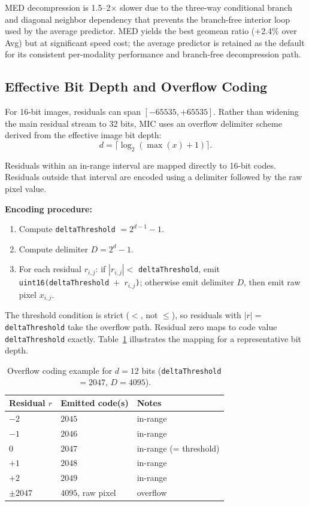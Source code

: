 \documentclass[journal]{IEEEtran}
\begin{document}
MED decompression is 1.5--2$\times$ slower due to the three-way conditional
branch and diagonal neighbor dependency that prevents the branch-free interior
loop used by the average predictor. MED yields the best geomean ratio
($+$2.4\% over Avg) but at significant speed cost; the average predictor is
retained as the default for its consistent per-modality performance and
branch-free decompression path.

\subsection{Effective Bit Depth and Overflow Coding}

For 16-bit images, residuals can span $[-65535, +65535]$. Rather than widening
the main residual stream to 32 bits, MIC uses an overflow delimiter scheme
derived from the effective image bit depth:
\begin{equation}
  d = \lceil \log_2(\max(x) + 1) \rceil.
\end{equation}

Residuals within an in-range interval are mapped directly to 16-bit codes.
Residuals outside that interval are encoded using a delimiter followed by the
raw pixel value.

\textbf{Encoding procedure:}
\begin{enumerate}
  \item Compute \texttt{deltaThreshold} $= 2^{d-1} - 1$.
  \item Compute delimiter $D = 2^d - 1$.
  \item For each residual $r_{i,j}$: if $|r_{i,j}| <$ \texttt{deltaThreshold},
  emit \texttt{uint16(deltaThreshold $+$ $r_{i,j}$)}; otherwise emit delimiter
  $D$, then emit raw pixel $x_{i,j}$.
\end{enumerate}

The threshold condition is strict ($<$, not $\leq$), so residuals with
$|r| =$ \texttt{deltaThreshold} take the overflow path. Residual zero maps
to code value \texttt{deltaThreshold} exactly. Table~\ref{tab:overflow-map}
illustrates the mapping for a representative bit depth.

\begin{table}[htbp]
\centering
\caption{Overflow coding example for $d=12$ bits
(\texttt{deltaThreshold}$=2047$, $D=4095$).}
\label{tab:overflow-map}
\scriptsize
\begin{tabular}{lll}
\toprule
Residual $r$ & Emitted code(s) & Notes \\
\midrule
$-2$ & $2045$ & in-range \\
$-1$ & $2046$ & in-range \\
$0$  & $2047$ & in-range (= threshold) \\
$+1$ & $2048$ & in-range \\
$+2$ & $2049$ & in-range \\
$\pm 2047$ & $4095$, raw pixel & overflow \\
\bottomrule
\end{tabular}
\end{table}
\end{document}
